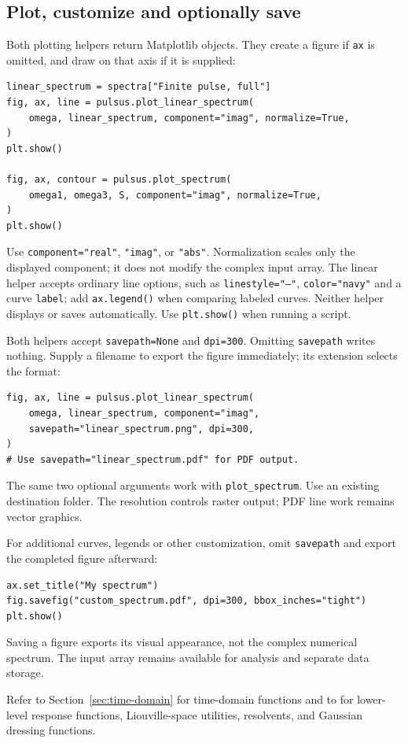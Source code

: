 \subsection{Plot, customize and optionally save}
\label{sec:plot-export}

Both plotting helpers return Matplotlib objects. They create a figure if
\texttt{ax} is omitted, and draw on that axis if it is supplied:
\par\noindent
\begin{minipage}{\linewidth}
\begin{lstlisting}[style=python]
linear_spectrum = spectra["Finite pulse, full"]
fig, ax, line = pulsus.plot_linear_spectrum(
    omega, linear_spectrum, component="imag", normalize=True,
)
plt.show()

fig, ax, contour = pulsus.plot_spectrum(
    omega1, omega3, S, component="imag", normalize=True,
)
plt.show()
\end{lstlisting}
\end{minipage}\par
Use \texttt{component="real"}, \texttt{"imag"}, or \texttt{"abs"}.
Normalization scales only the displayed component; it does not modify
the complex input array. The linear helper accepts ordinary line options,
such as \texttt{linestyle="--"}, \texttt{color="navy"} and a curve
\texttt{label}; add \texttt{ax.legend()} when comparing labeled curves.
Neither helper displays or saves automatically. Use \texttt{plt.show()}
when running a script.

Both helpers accept \texttt{savepath=None} and \texttt{dpi=300}.
Omitting \texttt{savepath} writes nothing. Supply a filename to export the
figure immediately; its extension selects the format:
\begin{lstlisting}[style=python]
fig, ax, line = pulsus.plot_linear_spectrum(
    omega, linear_spectrum, component="imag",
    savepath="linear_spectrum.png", dpi=300,
)
# Use savepath="linear_spectrum.pdf" for PDF output.
\end{lstlisting}
The same two optional arguments work with \texttt{plot\_spectrum}.
Use an existing destination folder. The resolution controls raster
output; PDF line work remains vector graphics.

For additional curves, legends or other customization, omit
\texttt{savepath} and export the completed figure afterward:
\begin{lstlisting}[style=python]
ax.set_title("My spectrum")
fig.savefig("custom_spectrum.pdf", dpi=300, bbox_inches="tight")
plt.show()
\end{lstlisting}
Saving a figure exports its visual appearance, not the complex numerical
spectrum. The input array remains available for analysis and separate data
storage.

Refer to Section~\ref{sec:time-domain} for time-domain
functions and to  for lower-level response functions,
Liouville-space utilities, resolvents, and Gaussian dressing functions.
